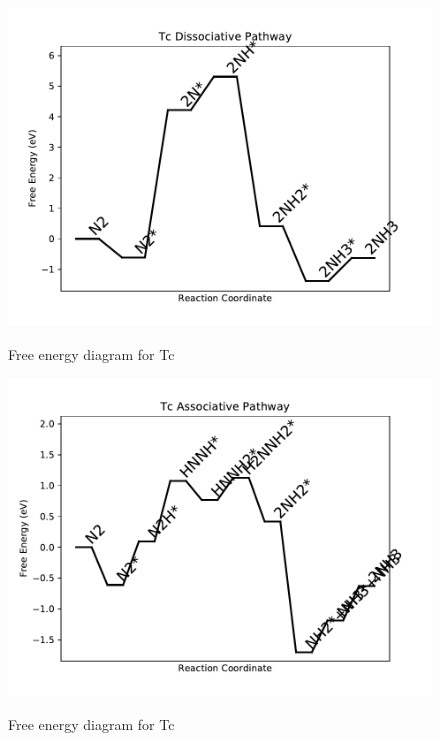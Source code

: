 \documentclass{article}
\begin{document}
\begin{figure}
\includegraphics[width=1\linewidth]{data/plots/Tc_dissociative.pdf}
\label{fig:Tc_dissociative}
\caption{Free energy diagram for Tc}
\end{figure}

\clearpage
\begin{figure}
\includegraphics[width=1\linewidth]{data/plots/Tc_associative.pdf}
\label{fig:Tc_associative}
\caption{Free energy diagram for Tc}
\end{figure}
\end{document}
